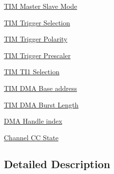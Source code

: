 \begin{DoxyCompactItemize}
\item 
\hyperlink{group___t_i_m___master___slave___mode}{T\+I\+M Master Slave Mode}
\item 
\hyperlink{group___t_i_m___trigger___selection}{T\+I\+M Trigger Selection}
\item 
\hyperlink{group___t_i_m___trigger___polarity}{T\+I\+M Trigger Polarity}
\item 
\hyperlink{group___t_i_m___trigger___prescaler}{T\+I\+M Trigger Prescaler}
\item 
\hyperlink{group___t_i_m___t_i1___selection}{T\+I\+M T\+I1 Selection}
\item 
\hyperlink{group___t_i_m___d_m_a___base__address}{T\+I\+M D\+M\+A Base address}
\item 
\hyperlink{group___t_i_m___d_m_a___burst___length}{T\+I\+M D\+M\+A Burst Length}
\item 
\hyperlink{group___d_m_a___handle__index}{D\+M\+A Handle index}
\item 
\hyperlink{group___channel___c_c___state}{Channel C\+C State}
\end{DoxyCompactItemize}


\subsection{Detailed Description}
